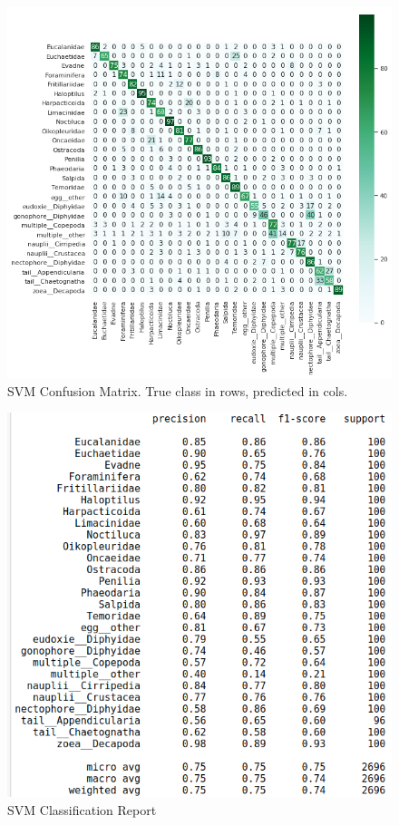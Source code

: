 \documentclass[10pt]{article}
\begin{document}
\begin{figure}
\includegraphics[scale=.55]{svm_acc.png}
\caption{SVM Confusion Matrix. True class in rows, predicted in cols.}
\end{figure}

\begin{figure}
\includegraphics[scale=.55]{svm_crep.png}
\caption{SVM Classification Report}
\end{figure}
\end{document}

